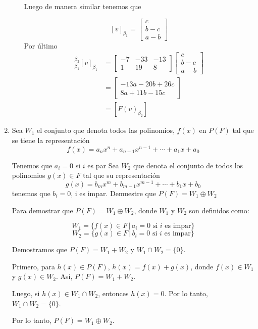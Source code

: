 \documentclass{report}
\begin{document}
\begin{enumerate}
\begin{enumerate}
            Luego de manera similar tenemos que 

            $$
            [v]_{\beta_1} = \begin{bmatrix}
                c\\
                b-c\\
                a-b
            \end{bmatrix}
            $$
            Por último
            \begin{align*}
                [F]_{\beta_1}^{\beta_2}[v]_{\beta_1} &=
                \begin{bmatrix}
                    -7 & -33 & -13 \\
                    1 & 19 & 8
                \end{bmatrix} \begin{bmatrix}
                    c\\
                    b-c\\
                    a-b
                \end{bmatrix}\\
                &= \begin{bmatrix}
                    -13a  -20b +26c \\
                    8a + 11b -15c
                \end{bmatrix}\\
                &= [F(v)_{\beta_2}]
            \end{align*}
        \end{enumerate}

        \item Sea $W_1$ el conjunto que denota todos las polinomios, $f(x)$ en $P(F)$ tal que se tiene la representación
        $$
        f(x)=a_n x^n+a_{n-1} x^{n-1}+\cdots+a_1 x+a_0
        $$

        Tenemos que $a_i=0$ si $i$ es par
        Sea $W_2$ que denota el conjunto de todos los polinomios $g(x) \in F$ tal que su representación
        $$
        g(x)=b_m x^m+b_{m-1} x^{m-1}+\cdots+b_1 x+b_0
        $$
        tenemos que $b_i=0$, i es impar. Demuestre que $P(F) = W_1 \oplus W_2$

        Para demostrar que $P(F) = W_1 \oplus W_2$, donde $W_1$ y $W_2$ son definidos como:

        \[ W_1 = \{ f(x) \in F \, | \, a_i = 0 \text{ si } i \text{ es impar} \} \]
        \[ W_2 = \{ g(x) \in F \, | \, b_i = 0 \text{ si } i \text{ es impar} \} \]

        Demostramos que $P(F) = W_1 + W_2$ y $W_1 \cap W_2 = \{0\}$.

        Primero, para $h(x) \in P(F)$, $h(x) = f(x) + g(x)$, donde $f(x) \in W_1$ y $g(x) \in W_2$. Así, $P(F) = W_1 + W_2$.

        Luego, si $h(x) \in W_1 \cap W_2$, entonces $h(x) = 0$. Por lo tanto, $W_1 \cap W_2 = \{0\}$.

        Por lo tanto, $P(F) = W_1 \oplus W_2$.
    \end{enumerate}
\end{document}
